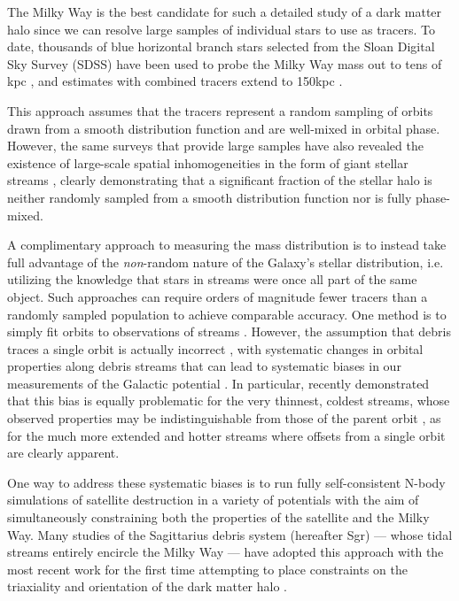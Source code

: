 \documentclass{emulateapj}
\begin{document}
The Milky Way is the best candidate for such a detailed study of a dark matter halo
since we can resolve large samples of individual stars to use as tracers.
To date, thousands of blue horizontal branch stars selected from the Sloan Digital Sky Survey (SDSS) have been used to probe the Milky Way mass out to tens of
kpc \citep[SDSS, see][]{deason12a,kafle12}, and estimates with combined tracers extend to 150kpc \citep{deason12b}.

This approach assumes that the tracers represent a random sampling of orbits drawn from a smooth distribution function and are well-mixed in orbital phase. However, the same surveys that provide large samples have also revealed the existence of large-scale spatial inhomogeneities in the form of giant stellar streams \citep{newberg02,majewski03,belokurov06}, clearly demonstrating that a significant fraction of the stellar halo is neither randomly sampled from a smooth distribution function nor is fully phase-mixed.

A complimentary approach to measuring the mass distribution is to instead take full advantage of the {\it non}-random nature of the Galaxy's stellar distribution, i.e. utilizing the knowledge that stars in streams were once all part of the same object.
Such approaches can require orders of magnitude fewer tracers than a randomly sampled population to achieve comparable accuracy.
One method is to simply fit orbits to observations of streams 
\citep[e.g.,][]{koposov10}.
However, the assumption that debris traces a single orbit is actually incorrect \citep[see][]{johnston98,helmi99}, with
systematic changes in orbital properties along debris streams that can lead to systematic biases in our measurements of the Galactic potential \citep{eyre09a,varghese11}.
In particular, \citet{sanders13a} recently demonstrated that this bias is equally problematic for the very thinnest, coldest streams, whose observed properties may be indistinguishable from those of the parent orbit \citep[e.g. such as the globular cluster, GD1 --- see][]{koposov10}, as for the much more extended and hotter streams \citep[e.g. such as debris from the Sagittarius dwarf galaxy --- see][]{majewski03} where offsets from a single orbit are clearly apparent.

One way to address these systematic biases is to run fully self-consistent N-body simulations of satellite destruction in a variety of potentials with the aim of simultaneously constraining both the properties of the satellite and the Milky Way.
Many studies of the Sagittarius debris system (hereafter Sgr) --- whose tidal streams entirely encircle the Milky Way --- have adopted this approach 
with the most recent work for the first time attempting to place constraints on the triaxiality and orientation of the dark matter halo
\citep{law10}.
\end{document}
